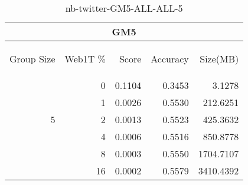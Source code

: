 \begin{center}
\begin{table}[htbp] 
 \begin{center}
\begin{tabular}{ | r | r | r | r | r |}
\hline
\multicolumn{5}{|c|}{GM5}\\
\hline
\begin{sideways}Group Size\end{sideways} & \begin{sideways}Web1T \%\end{sideways} & \begin{sideways}Score\end{sideways} & \begin{sideways}Accuracy\end{sideways} & \begin{sideways}Size(MB)\end{sideways}\\
\hline
\multirow{5}{*}{5}
 & 0 & 0.1104 & 0.3453 & 3.1278\\ \cline{2-5}
 & 1 & 0.0026 & 0.5530 & 212.6251\\ \cline{2-5}
 & 2 & 0.0013 & 0.5523 & 425.3632\\ \cline{2-5}
 & 4 & 0.0006 & 0.5516 & 850.8778\\ \cline{2-5}
 & 8 & 0.0003 & 0.5550 & 1704.7107\\ \cline{2-5}
 & 16 & 0.0002 & 0.5579 & 3410.4392\\ \cline{2-5}
\hline
\end{tabular}
\caption{nb-twitter-GM5-ALL-ALL-5}
\label{table:nb-twitter-GM5-ALL-ALL-5}
\end{center}
 \end{table}
\end{center}

